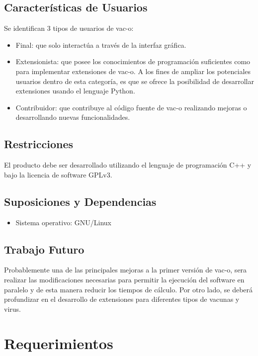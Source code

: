 \documentclass[10pt,a4paper]{article}
\begin{document}
  \subsection{Caracter\'isticas de Usuarios}
  Se identifican 3 tipos de usuarios de vac-o:
  \begin{itemize}
    \item Final: que solo interact\'ua a trav\'es de la interfaz gr\'afica.
    \item Extensionista: que posee los conocimientos de programaci\'on suficientes como para implementar extensiones de vac-o. A los fines de ampliar los potenciales usuarios dentro de esta categor\'ia, es que se ofrece la posibilidad de desarrollar extensiones usando el lenguaje Python.
    \item Contribuidor: que contribuye al c\'odigo fuente de vac-o realizando mejoras o desarrollando nuevas funcionalidades.
  \end{itemize}

  \subsection{Restricciones}
  El producto debe ser desarrollado utilizando el lenguaje de programaci\'on C++ y bajo la licencia de software GPLv3.
  
  \subsection{Suposiciones y Dependencias}
    \begin{itemize}
      \item Sistema operativo: GNU/Linux
    \end{itemize}
  
  \subsection{Trabajo Futuro}
  Probablemente una de las principales mejoras a la primer versi\'on de vac-o, sera realizar las modificaciones necesarias para permitir la ejecuci\'on del software en paralelo y de esta manera reducir los tiempos de c\'alculo. 
  Por otro lado, se deber\'a profundizar en el desarrollo de extensiones para diferentes tipos de vacunas y virus.
  

\section{Requerimientos}
  \label{section-req}  
\end{document}
